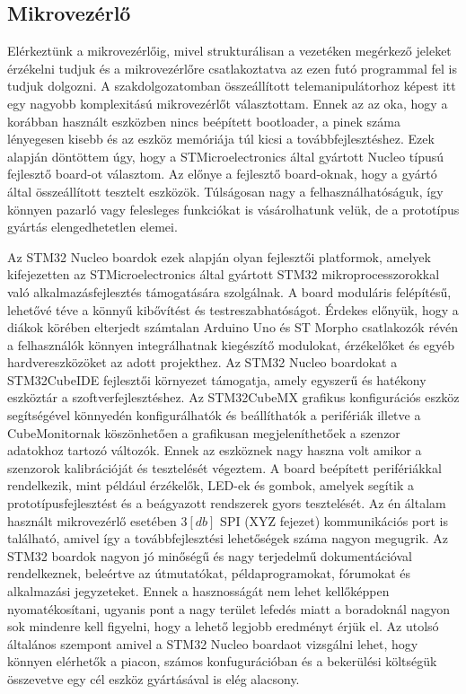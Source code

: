 
\subsection{Mikrovezérlő}
\label{sec:mikrovez_bemut}

Elérkeztünk a mikrovezérlőig, mivel strukturálisan a vezetéken megérkező jeleket érzékelni tudjuk és a mikrovezérlőre csatlakoztatva az ezen futó programmal fel is tudjuk dolgozni. A szakdolgozatomban összeállított telemanipulátorhoz képest itt egy nagyobb komplexitású mikrovezérlőt választottam. Ennek az az oka, hogy a korábban használt eszközben nincs beépített bootloader, a pinek száma lényegesen kisebb és az eszköz memóriája túl kicsi a továbbfejlesztéshez. Ezek alapján döntöttem úgy, hogy a STMicroelectronics által gyártott Nucleo típusú fejlesztő board-ot választom. Az előnye a fejlesztő board-oknak, hogy a gyártó által összeállított tesztelt eszközök. Túlságosan nagy a felhasználhatóságuk, így könnyen pazarló vagy felesleges funkciókat is vásárolhatunk velük, de a prototípus gyártás elengedhetetlen elemei.


Az STM32 Nucleo boardok ezek alapján olyan fejlesztői platformok, amelyek kifejezetten az STMicroelectronics által gyártott STM32 mikroprocesszorokkal való alkalmazásfejlesztés támogatására szolgálnak. A board moduláris felépítésű, lehetővé téve a könnyű kibővítést és testreszabhatóságot. Érdekes előnyük, hogy a diákok körében elterjedt számtalan Arduino Uno és ST Morpho csatlakozók révén a felhasználók könnyen integrálhatnak kiegészítő modulokat, érzékelőket és egyéb hardvereszközöket az adott projekthez. Az STM32 Nucleo boardokat a STM32CubeIDE fejlesztői környezet támogatja, amely egyszerű és hatékony eszköztár a szoftverfejlesztéshez. Az STM32CubeMX grafikus konfigurációs eszköz segítségével könnyedén konfigurálhatók és beállíthatók a perifériák illetve a CubeMonitornak köszönhetően a grafikusan megjeleníthetőek a szenzor adatokhoz tartozó változók. Ennek az eszköznek nagy haszna volt amikor a szenzorok kalibrációját és tesztelését végeztem. A board beépített perifériákkal rendelkezik, mint például érzékelők, LED-ek és gombok, amelyek segítik a prototípusfejlesztést és a beágyazott rendszerek gyors tesztelését. Az én általam használt mikrovezérlő esetében $3[db]$ SPI (XYZ fejezet) kommunikációs port is található, amivel így a továbbfejlesztési lehetőségek száma nagyon megugrik. Az STM32 boardok nagyon jó minőségű és nagy terjedelmű dokumentációval rendelkeznek, beleértve az útmutatókat, példaprogramokat, fórumokat és alkalmazási jegyzeteket. Ennek a hasznosságát nem lehet kellőképpen nyomatékosítani, ugyanis pont a nagy terület lefedés miatt a boradoknál nagyon sok mindenre kell figyelni, hogy a lehető legjobb eredményt érjük el. Az utolsó általános szempont amivel a STM32 Nucleo boardaot vizsgálni lehet, hogy könnyen elérhetők a piacon, számos konfugurációban és a bekerülési költségük összevetve egy cél eszköz gyártásával is elég alacsony.

